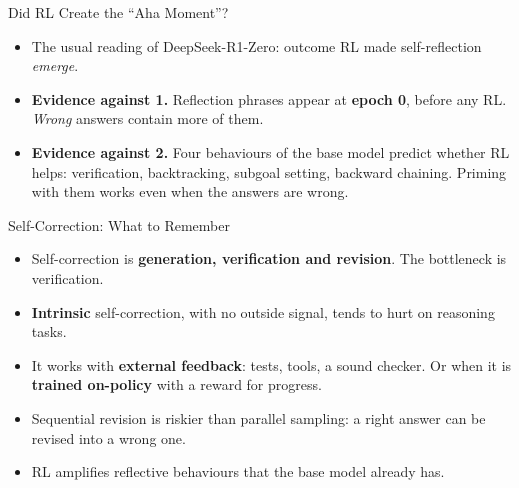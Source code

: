 \begin{frame}{Did RL Create the ``Aha Moment''?}
    \begin{itemize}\itemsep0.6em
        \item The usual reading of DeepSeek-R1-Zero: outcome RL made self-reflection \emph{emerge}.
        \item \textbf{Evidence against 1.} Reflection phrases appear at \textbf{epoch 0}, before any RL. \emph{Wrong} answers contain more of them.
        \item \textbf{Evidence against 2.} Four behaviours of the base model predict whether RL helps: verification, backtracking, subgoal setting, backward chaining. Priming with them works \alert{even when the answers are wrong}.
    \end{itemize}
    \vspace{0.4em}
\end{frame}

\begin{frame}{Self-Correction: What to Remember}
    \begin{itemize}\itemsep0.6em
        \item Self-correction is \textbf{generation, verification and revision}. The bottleneck is verification.
        \item \textbf{Intrinsic} self-correction, with no outside signal, tends to hurt on reasoning tasks.
        \item It works with \textbf{external feedback}: tests, tools, a sound checker. Or when it is \textbf{trained on-policy} with a reward for progress.
        \item Sequential revision is riskier than parallel sampling: a right answer can be revised into a wrong one.
        \item RL amplifies reflective behaviours that the base model already has.
    \end{itemize}
    \vspace{0.3em}
    \vspace{0.2em}
\end{frame}
